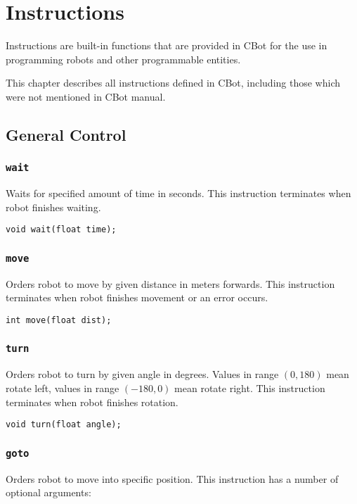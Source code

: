 
\chapter{Instructions}

Instructions are built-in functions that are provided in CBot for the use in programming robots and other programmable entities.

This chapter describes all instructions defined in CBot, including those which were not mentioned in CBot manual.


\section{General Control}

\subsection{\texttt{wait}}
Waits for specified amount of time in seconds. This instruction terminates when robot finishes waiting.

\begin{lstlisting}
void wait(float time);
\end{lstlisting}


\subsection{\texttt{move}}
Orders robot to move by given distance in meters forwards. This instruction terminates when robot finishes movement or an error occurs.

\begin{lstlisting}
int move(float dist);
\end{lstlisting}


\subsection{\texttt{turn}}
\label{sec:cbot_turn}
Orders robot to turn by given angle in degrees. Values in range $(0, 180)$ mean rotate left, values in range $(-180, 0)$ mean rotate right. This instruction terminates when robot finishes rotation.

\begin{lstlisting}
void turn(float angle);
\end{lstlisting}


\subsection{\texttt{goto}}
Orders robot to move into specific position. This instruction has a number of optional arguments:

